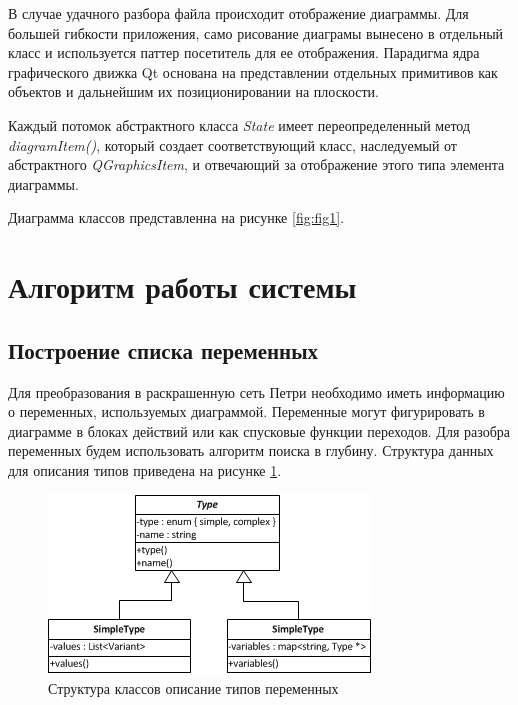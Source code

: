 В случае удачного разбора файла происходит отображение диаграммы. Для большей гибкости приложения, само рисование диаграмы вынесено в отдельный класс и используется паттер посетитель для ее отображения. Парадигма ядра графического движка Qt основана на представлении отдельных примитивов как объектов и дальнейшим их позиционировании на плоскости.

Каждый потомок абстрактного класса \textit{State} имеет переопределенный метод \textit{diagramItem()}, который создает соответствующий класс, наследуемый от абстрактного \textit{QGraphicsItem}, и отвечающий за отображение этого типа элемента диаграммы.

Диаграмма классов представленна на рисунке \ref{fig:fig1}.


\section{Алгоритм работы системы}

\subsection{Построение списка переменных}

Для преобразования в раскрашенную сеть Петри необходимо иметь информацию о переменных, используемых диаграммой. Переменные могут фигурировать в диаграмме в блоках действий или как спусковые функции переходов. Для разобра переменных будем использовать алгоритм поиска в глубину. Структура данных для описания типов приведена на рисунке \ref{fig:fig2}.

\begin{figure}
	\begin{center}
		\includegraphics[scale=1]{include/Type.png}
	\end{center}
	\caption{Структура классов описание типов переменных}
	\label{fig:fig2}
\end{figure}

